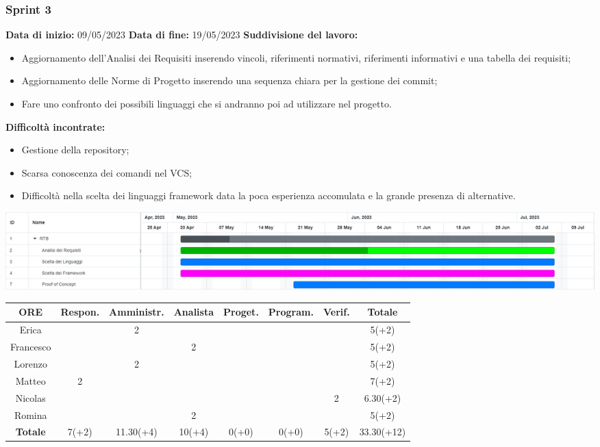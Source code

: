 \documentclass[a4paper, 12pt]{article}
\begin{document}
\subsubsection{Sprint 3}
\textbf{Data di inizio:} 09/05/2023\newline
\textbf{Data di fine:} 19/05/2023\newline
\newline
\textbf{Suddivisione del lavoro:}
\begin{itemize}
    \item Aggiornamento dell'Analisi dei Requisiti inserendo vincoli, riferimenti normativi, riferimenti informativi e una tabella dei requisiti;
    \item Aggiornamento delle Norme di Progetto inserendo una sequenza chiara per la gestione dei commit;
    \item Fare uno confronto dei possibili linguaggi che si andranno poi ad utilizzare nel progetto.
\end{itemize}
\textbf{Difficoltà incontrate:}
\begin{itemize}
    \item Gestione della repository;
    \item Scarsa conoscenza dei comandi nel VCS;
    \item Difficoltà nella scelta dei linguaggi framework data la poca esperienza accomulata e la grande presenza di alternative.
\end{itemize}
\includegraphics[scale=0.24]{RTB_2.png}\newline
\newline
\begin{tabular}{|c|c|c|c|c|c|c|c|}
    \hline
    \textbf{ORE} & \textbf{Respon.} & \textbf{Amministr.} & \textbf{Analista} & \textbf{Proget.} & \textbf{Program.} & \textbf{Verif.} & \textbf{Totale}\\
    \hline
    Erica & & 2 & & & & & 5(+2)\\
    \hline
    Francesco & & & 2 & & & & 5(+2)\\
    \hline
    Lorenzo & & 2 & & & & & 5(+2)\\
    \hline
    Matteo & 2 & & & & & & 7(+2)\\
    \hline
    Nicolas & & & & & & 2 & 6.30(+2)\\
    \hline
    Romina & & & 2 & & & & 5(+2)\\
    \hline
    \textbf{Totale} & 7(+2) & 11.30(+4) & 10(+4) & 0(+0) & 0(+0) & 5(+2) & 33.30(+12)\\
    \hline
\end{tabular}\\[8pt]
\end{document}
